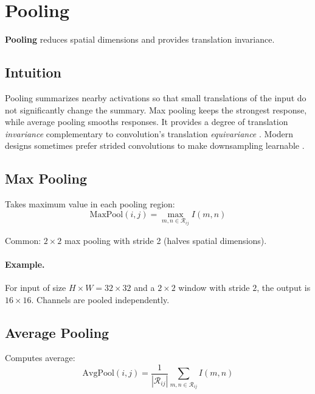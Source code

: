 
\section{Pooling}
\label{sec:pooling}

\textbf{Pooling} reduces spatial dimensions and provides translation invariance.

\subsection*{Intuition}
Pooling summarizes nearby activations so that small translations of the input do not significantly change the summary. Max pooling keeps the strongest response, while average pooling smooths responses. It provides a degree of translation \emph{invariance} complementary to convolution's translation \emph{equivariance} . Modern designs sometimes prefer strided convolutions to make downsampling learnable \cite{GoodfellowEtAl2016,He2016}.

\subsection{Max Pooling}

Takes maximum value in each pooling region:
\begin{equation}
\text{MaxPool}(i,j) = \max_{m,n \in \mathcal{R}_{ij}} I(m,n)
\end{equation}

Common: $2 \times 2$ max pooling with stride 2 (halves spatial dimensions).

\paragraph{Example.} For input of size $H\times W=32\times32$ and a $2\times2$ window with stride $2$, the output is $16\times16$. Channels are pooled independently.

\subsection{Average Pooling}

Computes average:
\begin{equation}
\text{AvgPool}(i,j) = \frac{1}{|\mathcal{R}_{ij}|} \sum_{m,n \in \mathcal{R}_{ij}} I(m,n)
\end{equation}

